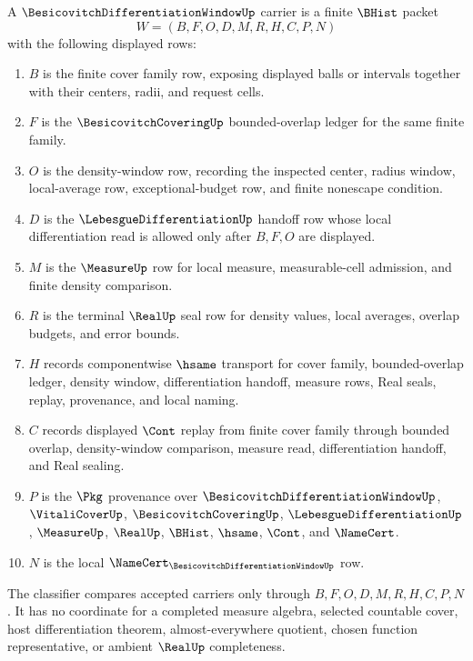 \begin{definition}
\label{def:besicovitch-differentiation-window-carrier}
A $\BesicovitchDifferentiationWindowUp$ carrier is a finite $\BHist$ packet
$$
W=(B,F,O,D,M,R,H,C,P,N)
$$
with the following displayed rows:
\begin{enumerate}
\item $B$ is the finite cover family row, exposing displayed balls or intervals together with their centers, radii, and request cells.
\item $F$ is the $\BesicovitchCoveringUp$ bounded-overlap ledger for the same finite family.
\item $O$ is the density-window row, recording the inspected center, radius window, local-average row, exceptional-budget row, and finite nonescape condition.
\item $D$ is the $\LebesgueDifferentiationUp$ handoff row whose local differentiation read is allowed only after $B,F,O$ are displayed.
\item $M$ is the $\MeasureUp$ row for local measure, measurable-cell admission, and finite density comparison.
\item $R$ is the terminal $\RealUp$ seal row for density values, local averages, overlap budgets, and error bounds.
\item $H$ records componentwise $\hsame$ transport for cover family, bounded-overlap ledger, density window, differentiation handoff, measure rows, Real seals, replay, provenance, and local naming.
\item $C$ records displayed $\Cont$ replay from finite cover family through bounded overlap, density-window comparison, measure read, differentiation handoff, and Real sealing.
\item $P$ is the $\Pkg$ provenance over $\BesicovitchDifferentiationWindowUp$, $\VitaliCoverUp$, $\BesicovitchCoveringUp$, $\LebesgueDifferentiationUp$, $\MeasureUp$, $\RealUp$, $\BHist$, $\hsame$, $\Cont$, and $\NameCert$.
\item $N$ is the local $\NameCert_{\BesicovitchDifferentiationWindowUp}$ row.
\end{enumerate}
The classifier compares accepted carriers only through $B,F,O,D,M,R,H,C,P,N$. It has no coordinate for a completed measure algebra, selected countable cover, host differentiation theorem, almost-everywhere quotient, chosen function representative, or ambient $\RealUp$ completeness.
\end{definition}

